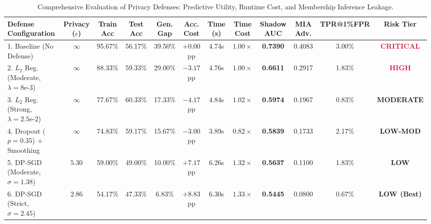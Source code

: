 \documentclass[10pt,twocolumn]{article}
\begin{document}
\begin{table}[t]
\centering
\caption{Comprehensive Evaluation of Privacy Defenses: Predictive Utility, Runtime Cost, and Membership Inference Leakage.}
\label{tab:main_results}
\renewcommand{\arraystretch}{1.12}
\setlength{\tabcolsep}{4.8pt}
\footnotesize
\begin{tabular}{lccccccccccc}
\toprule
\textbf{Defense Configuration} & \textbf{Privacy} ($\epsilon$) & \textbf{Train Acc} & \textbf{Test Acc} & \textbf{Gen. Gap} & \textbf{Acc. Cost} & \textbf{Time (s)} & \textbf{Time Cost} & \textbf{Shadow AUC} & \textbf{MIA Adv.} & \textbf{TPR@1\%FPR} & \textbf{Risk Tier} \\
\midrule
1. Baseline (No Defense) & $\infty$ & 95.67\% & 56.17\% & 39.50\% & $+0.00$ pp & 4.74s & $1.00\times$ & \textbf{0.7390} & 0.4083 & 3.00\% & \textcolor{crimson}{\textbf{CRITICAL}} \\
2. $L_2$ Reg. (Moderate, $\lambda=8\text{e-}3$) & $\infty$ & 88.33\% & 59.33\% & 29.00\% & $-3.17$ pp & 4.76s & $1.00\times$ & \textbf{0.6611} & 0.2917 & 1.83\% & \textcolor{crimson}{\textbf{HIGH}} \\
3. $L_2$ Reg. (Strong, $\lambda=2.5\text{e-}2$) & $\infty$ & 77.67\% & 60.33\% & 17.33\% & $-4.17$ pp & 4.84s & $1.02\times$ & \textbf{0.5974} & 0.1967 & 0.83\% & \textbf{MODERATE} \\
4. Dropout ($p=0.35$) + Smoothing & $\infty$ & 74.83\% & 59.17\% & 15.67\% & $-3.00$ pp & 3.89s & $0.82\times$ & \textbf{0.5839} & 0.1733 & 2.17\% & \textbf{LOW-MOD} \\
5. DP-SGD (Moderate, $\sigma=1.38$) & $5.30$ & 59.00\% & 49.00\% & 10.00\% & $+7.17$ pp & 6.26s & $1.32\times$ & \textbf{0.5637} & 0.1100 & 1.83\% & \textcolor{tealblue}{\textbf{LOW}} \\
6. DP-SGD (Strict, $\sigma=2.45$) & $2.86$ & 54.17\% & 47.33\% & 6.83\% & $+8.83$ pp & 6.30s & $1.33\times$ & \textbf{0.5445} & 0.0800 & 0.67\% & \textcolor{tealblue}{\textbf{LOW (Best)}} \\
\bottomrule
\end{tabular}
\end{table}
\end{document}
